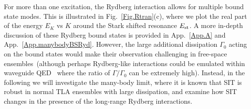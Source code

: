 \documentclass[pra,twocolumn,showpacs,preprintnumbers,amsmath,amssymb]{revtex4-1}
\begin{document}
For more than one excitation, the Rydberg interaction allows for multiple bound state modes. This is illustrated in Fig.~\ref{Fig.Rtran}(c), where we plot the real part of the energy $E_K$ vs $K$ around the Stark shifted resonance $E_{\rm st}$.
A more in-depth discussion of these Rydberg bound states is provided in  App.~\ref{App.A} and App.~\ref{App.manybodyBSRyd}. However, the large additional dissipation $\Gamma_0$ acting on the bound states would make their observation challenging in free-space ensembles~(although perhaps Rydberg-like interactions could be emulated within waveguide QED~\cite{Efioptica,PRXcaneva} where the ratio of $\Gamma/\Gamma_0$ can be extremely high). Instead, in the following we will investigate the many-body limit, where it is known that SIT is robust in normal TLA ensembles with large dissipation, and examine how SIT changes in the presence of the long-range Rydberg interactions. 

\end{document}

